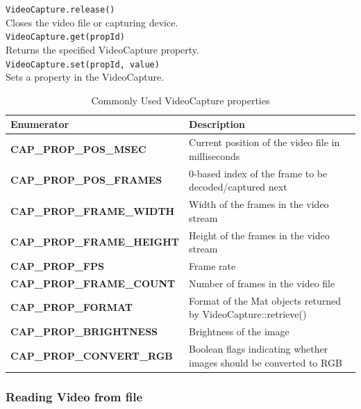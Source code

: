 \documentclass{article}
\theoremstyle{definition}
\theoremstyle{remark}
\newcommand{\func}[2]{\noindent\lstinline{#1}\\#2}
\begin{document}
\func{VideoCapture.release()}{
Closes the video file or capturing device.\\
}

\func{VideoCapture.get(propId)}{
Returns the specified VideoCapture property.\\
}

\func{VideoCapture.set(propId, value)}{
Sets a property in the VideoCapture.\\
}


\begin{table}[h!]
    \centering
    \def\arraystretch{1.1}%
    \begin{tabular}{ p{5cm} p{7cm} } 
    \hline
    Enumerator &  Description \\
    \hline
    \textbf{\footnotesize{CAP\_PROP\_POS\_MSEC}} & Current position of the video file in milliseconds \\

    \textbf{\footnotesize{CAP\_PROP\_POS\_FRAMES}} & 0-based index of the frame to be decoded/captured next \\

    \textbf{\footnotesize{CAP\_PROP\_FRAME\_WIDTH}} & Width of the frames in the video stream \\

    \textbf{\footnotesize{CAP\_PROP\_FRAME\_HEIGHT}} & Height of the frames in the video stream \\

    \textbf{\footnotesize{CAP\_PROP\_FPS}} & Frame rate \\

    \textbf{\footnotesize{CAP\_PROP\_FRAME\_COUNT}} & Number of frames in the video file \\

    \textbf{\footnotesize{CAP\_PROP\_FORMAT}} & Format of the Mat objects returned by VideoCapture::retrieve() \\

    \textbf{\footnotesize{CAP\_PROP\_BRIGHTNESS}} & Brightness of the image \\

    \textbf{\footnotesize{CAP\_PROP\_CONVERT\_RGB}} & Boolean flags indicating whether images should be converted to RGB \\
    \hline
    \end{tabular}
    \caption{Commonly Used VideoCapture properties}
    \label{table:ocv_vca_props}
\end{table}

\subsubsection{Reading Video from file}
\end{document}
